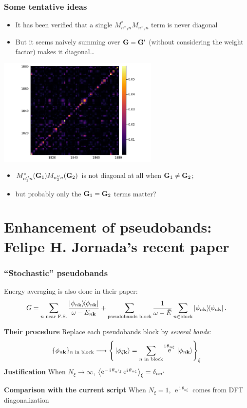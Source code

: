 \documentclass[t,aspectratio=169]{beamer}
\DeclareMathOperator{\ee}{e}
\DeclareMathOperator{\ii}{i}
\begin{document}
\begin{frame}[allowframebreaks]
\frametitle{Some tentative ideas}

\begin{itemize}
    \item It has been verified that a single $M_{n''_1 n}^* M_{n''_2 n}$ term is never diagonal
    \item But it seems naively summing over $\vb{G} = \vb{G}'$ (without considering the weight factor)
    makes it diagonal\dots
\end{itemize}    

\begin{center}
    \includegraphics[width=0.6\textwidth]{../data/sigma/nc_range-1800-1880-n_idx-119-n_prime_idx_119-k_idx-1-q_idx-1-G_range-800-900.png}
\end{center}

\begin{itemize}
    \item $M_{n''_1 n}^*(\vb{G}_1) M_{n''_2 n}(\vb{G}_2)$ is not diagonal at all when $\vb{G}_1 \neq \vb{G}_2$; 
    \item but probably only the $\vb{G}_1 = \vb{G}_2$ terms matter?
\end{itemize}

\end{frame}

\section{Enhancement of pseudobands: Felipe H. Jornada's recent paper}

\begin{frame}
\frametitle{``Stochastic'' pseudobands}

Energy averaging is also done in their paper:
\[
    G = \sum_{\text{$n$ near F.S.}} \frac{\dyad{\phi_{n \vb{k}}}}{\omega - E_{n \vb{k}}} + \sum_{\text{pseudobands block}} \frac{1}{\omega - \bar{E}} \sum_{n \in \text{block}} \dyad{\phi_{n \vb{k}}}.
\]     

\textbf{Their procedure} Replace each pseudobands block by \emph{several bands}:
\[
    \{\phi_{n \vb{k}}\}_{\text{$n$ in block}} \longrightarrow
    \left\{
        \ket*{\phi_{\xi \vb{k}}} = \sum_{\text{$n$ in block}} 
        \ee^{\ii \theta_{n \xi}} \ket*{\phi_{n \vb{k}}}
    \right\}_\xi
\]
\textbf{Justification} When $N_\xi \to \infty$, 
$\expval{
    \ee^{- \ii \theta_{n' \xi}} \ee^{\ii \theta_{n \xi}}
}_\xi = \delta_{n n'}$

\textbf{Comparison with the current script} When $N_\xi = 1$, 
$\ee^{\ii \theta_{n \xi}}$ comes from DFT diagonalization

\end{frame}
\end{document}
